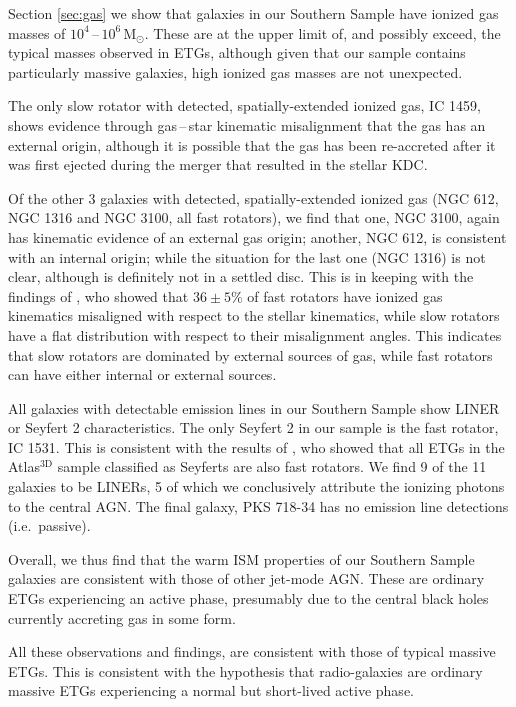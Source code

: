 \documentclass[a4paper,fleqn,usenatbib]{mnras}
\begin{document}
	Section \ref{sec:gas} we show that galaxies in our Southern Sample have ionized gas masses of $10^4$\,--\,$10^6\,\mathrm{M_\odot}$. These are at the upper limit of, and possibly exceed, the typical masses observed in ETGs, although given that our sample contains particularly massive galaxies, high ionized gas masses are not unexpected. 

	The only slow rotator with detected, spatially-extended ionized gas, IC 1459, shows evidence through gas\,--\,star kinematic misalignment that the gas has an external origin, although it is possible that the gas has been re-accreted after it was first ejected during the merger that resulted in the stellar KDC. 

	Of the other 3 galaxies with detected, spatially-extended ionized gas (NGC 612, NGC 1316 and NGC 3100, all fast rotators), we find that one, NGC 3100, again has kinematic evidence of an external gas origin; another, NGC 612, is consistent with an internal origin; while the situation for the last one (NGC 1316) is not clear, although is definitely not in a settled disc. This is in keeping with the findings of \citet{Davis2011a}, who showed that $36\pm5$\% of fast rotators have ionized gas kinematics misaligned with respect to the stellar kinematics, while slow rotators have a flat distribution with respect to their misalignment angles. This indicates that slow rotators are dominated by external sources of gas, while fast rotators can have either internal or external sources. 

	All galaxies with detectable emission lines in our Southern Sample show LINER or Seyfert 2 characteristics. The only Seyfert 2 in our sample is the fast rotator, IC 1531. This is consistent with the results of \citet{Nyland2016}, who showed that all ETGs in the Atlas$^\text{3D}$ sample classified as Seyferts are also fast rotators. We find 9 of the 11 galaxies to be LINERs, 5 of which we conclusively attribute the ionizing photons to the central AGN. The final galaxy, PKS 718-34 has no emission line detections (i.e.\ passive). 

	Overall, we thus find that the warm ISM properties of our Southern Sample galaxies are consistent with those of other jet-mode AGN. These are ordinary ETGs experiencing an active phase, presumably due to the central black holes currently accreting gas in some form. 

	All these observations and findings, are consistent with those of typical massive ETGs. This is consistent with the hypothesis that radio-galaxies are ordinary massive ETGs experiencing a normal but short-lived active phase. 
\end{document}
